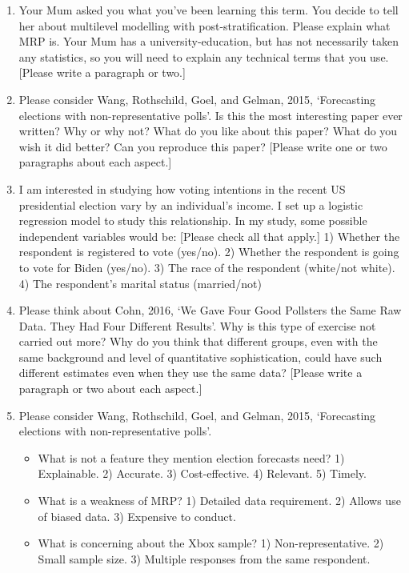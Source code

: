 \documentclass[
]{book}
\providecommand{\tightlist}{%
  \setlength{\itemsep}{0pt}\setlength{\parskip}{0pt}}
\begin{document}
\begin{enumerate}
\def\labelenumi{\arabic{enumi}.}
\tightlist
\item
  Your Mum asked you what you've been learning this term. You decide to tell her about multilevel modelling with post-stratification. Please explain what MRP is. Your Mum has a university-education, but has not necessarily taken any statistics, so you will need to explain any technical terms that you use. {[}Please write a paragraph or two.{]}
\item
  Please consider Wang, Rothschild, Goel, and Gelman, 2015, `Forecasting elections with non-representative polls'. Is this the most interesting paper ever written? Why or why not? What do you like about this paper? What do you wish it did better? Can you reproduce this paper? {[}Please write one or two paragraphs about each aspect.{]}
\item
  I am interested in studying how voting intentions in the recent US presidential election vary by an individual's income. I set up a logistic regression model to study this relationship. In my study, some possible independent variables would be: {[}Please check all that apply.{]} 1) Whether the respondent is registered to vote (yes/no). 2) Whether the respondent is going to vote for Biden (yes/no). 3) The race of the respondent (white/not white). 4) The respondent's marital status (married/not)
\item
  Please think about Cohn, 2016, `We Gave Four Good Pollsters the Same Raw Data. They Had Four Different Results'. Why is this type of exercise not carried out more? Why do you think that different groups, even with the same background and level of quantitative sophistication, could have such different estimates even when they use the same data? {[}Please write a paragraph or two about each aspect.{]}
\item
  Please consider Wang, Rothschild, Goel, and Gelman, 2015, `Forecasting elections with non-representative polls'.

  \begin{itemize}
  \tightlist
  \item
    What is not a feature they mention election forecasts need? 1) Explainable. 2) Accurate. 3) Cost-effective. 4) Relevant. 5) Timely.
  \item
    What is a weakness of MRP? 1) Detailed data requirement. 2) Allows use of biased data. 3) Expensive to conduct.
  \item
    What is concerning about the Xbox sample? 1) Non-representative. 2) Small sample size. 3) Multiple responses from the same respondent.
  \end{itemize}
\end{enumerate}
\end{document}
